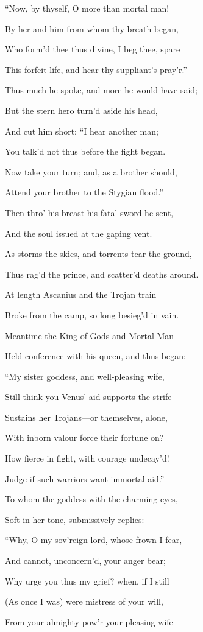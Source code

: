 “Now, by thyself, O more than mortal man!

By her and him from whom thy breath began,

Who form’d thee thus divine, I beg thee, spare

This forfeit life, and hear thy suppliant’s pray’r.”

Thus much he spoke, and more he would have said;

But the stern hero turn’d aside his head,

And cut him short: “I hear another man;

You talk’d not thus before the fight began.

Now take your turn; and, as a brother should,

Attend your brother to the Stygian flood.”

Then thro’ his breast his fatal sword he sent,

And the soul issued at the gaping vent.

As storms the skies, and torrents tear the ground,

Thus rag’d the prince, and scatter’d deaths around.

At length Ascanius and the Trojan train

Broke from the camp, so long besieg’d in vain.

Meantime the King of Gods and Mortal Man

Held conference with his queen, and thus began:

“My sister goddess, and well-pleasing wife,

Still think you Venus’ aid supports the strife—

Sustains her Trojans—or themselves, alone,

With inborn valour force their fortune on?

How fierce in fight, with courage undecay’d!

Judge if such warriors want immortal aid.”

To whom the goddess with the charming eyes,

Soft in her tone, submissively replies:

“Why, O my sov’reign lord, whose frown I fear,

And cannot, unconcern’d, your anger bear;

Why urge you thus my grief? when, if I still

(As once I was) were mistress of your will,

From your almighty pow’r your pleasing wife

